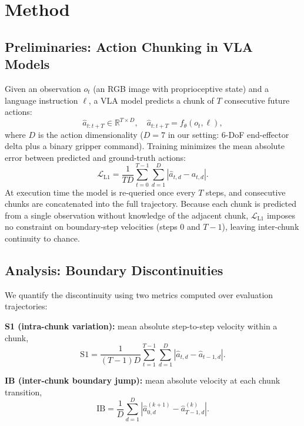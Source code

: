 \section{Method}
\label{sec:method}

\subsection{Preliminaries: Action Chunking in VLA Models}
Given an observation $o_t$ (an RGB image with proprioceptive state) and a language instruction $\ell$, a VLA model predicts a chunk of $T$ consecutive future actions:
\begin{equation}
    \hat{a}_{t:t+T} \in \mathbb{R}^{T \times D}, \quad \hat{a}_{t:t+T} = f_\theta(o_t, \ell),
    \label{eq:chunk}
\end{equation}
where $D$ is the action dimensionality ($D{=}7$ in our setting: 6-DoF end-effector delta plus a binary gripper command). Training minimizes the mean absolute error between predicted and ground-truth actions:
\begin{equation}
    \mathcal{L}_{\text{L1}} = \frac{1}{TD} \sum_{t=0}^{T-1} \sum_{d=1}^{D} \left| \hat{a}_{t,d} - a_{t,d} \right|.
    \label{eq:l1}
\end{equation}
At execution time the model is re-queried once every $T$ steps, and consecutive chunks are concatenated into the full trajectory. Because each chunk is predicted from a single observation without knowledge of the adjacent chunk, $\mathcal{L}_{\text{L1}}$ imposes no constraint on boundary-step velocities (steps 0 and $T{-}1$), leaving inter-chunk continuity to chance.

\subsection{Analysis: Boundary Discontinuities}
We quantify the discontinuity using two metrics computed over evaluation trajectories:

\textbf{S1 (intra-chunk variation):} mean absolute step-to-step velocity within a chunk,
\begin{equation}
    \text{S1} = \frac{1}{(T-1)D} \sum_{t=1}^{T-1} \sum_{d=1}^{D} \left| \hat{a}_{t,d} - \hat{a}_{t-1,d} \right|.
    \label{eq:s1}
\end{equation}

\textbf{IB (inter-chunk boundary jump):} mean absolute velocity at each chunk transition,
\begin{equation}
    \text{IB} = \frac{1}{D} \sum_{d=1}^{D} \left| \hat{a}^{(k+1)}_{0,d} - \hat{a}^{(k)}_{T-1,d} \right|.
    \label{eq:ib}
\end{equation}

